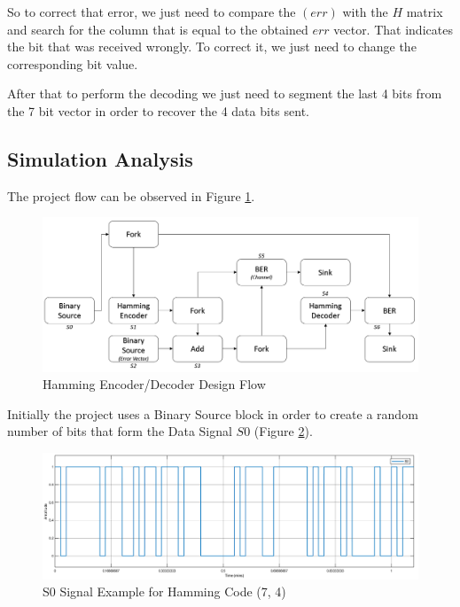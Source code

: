 \begin{refsection}
So to correct that error, we just need to compare the $(err)$ with the $H$ matrix and search for the column that is equal to the obtained $err$ vector. That indicates the bit that was received wrongly. To correct it, we just need to change the corresponding bit value.

After that to perform the decoding we just need to segment the last 4 bits from the 7 bit vector in order to recover the 4 data bits sent.

\subsection{Simulation Analysis}

The project flow can be observed in Figure \ref{fig:hammingEncoderDecoder}.

\begin{figure}[h!]
	\vspace{-3mm}
	\centering
	\includegraphics[width=.9\linewidth]{./sdf/eit_25828_hamming_channel_encoder_decoder/images/blockDesign.png}
	\vspace{-3mm}
	\caption{Hamming Encoder/Decoder Design Flow}
	\label{fig:hammingEncoderDecoder}
	\vspace{-3mm}
\end{figure}

Initially the project uses a Binary Source block in order to create a random number of bits that form the Data Signal $S0$ (Figure \ref{fig:hammingEncoderDecoder_S0}).

\begin{figure}[h!]
	\centering
	\includegraphics[width=.9\linewidth]{./sdf/eit_25828_hamming_channel_encoder_decoder/images/S0.png}
	\vspace{-3mm}
	\caption{S0 Signal Example for Hamming Code (7, 4)}
	\label{fig:hammingEncoderDecoder_S0}
\end{figure}


\end{refsection}
